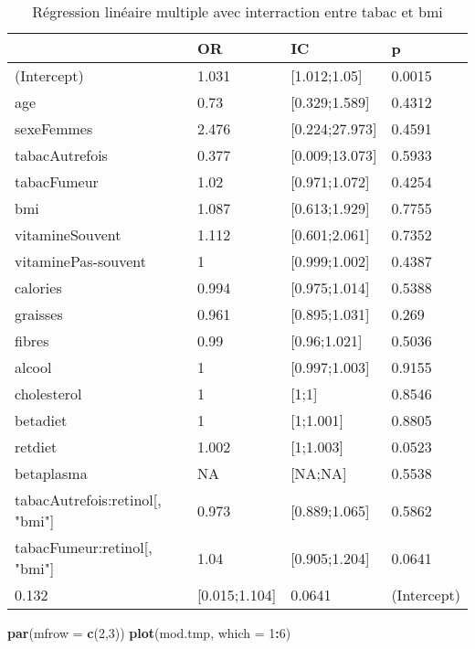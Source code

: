\documentclass[]{article}
\newenvironment{Shaded}{\begin{snugshade}}{\end{snugshade}}
\newcommand{\KeywordTok}[1]{\textcolor[rgb]{0.13,0.29,0.53}{\textbf{#1}}}
\newcommand{\DataTypeTok}[1]{\textcolor[rgb]{0.13,0.29,0.53}{#1}}
\newcommand{\DecValTok}[1]{\textcolor[rgb]{0.00,0.00,0.81}{#1}}
\newcommand{\OperatorTok}[1]{\textcolor[rgb]{0.81,0.36,0.00}{\textbf{#1}}}
\newcommand{\NormalTok}[1]{#1}
\begin{document}
\begin{table}

\caption{\label{tab:unnamed-chunk-85}Régression linéaire multiple avec interraction entre tabac et bmi}
\centering
\begin{tabular}[t]{l|l|l|l}
\hline
  & OR & IC & p\\
\hline
\rowcolor[HTML]{BBD2E1}  (Intercept) & 1.031 & [1.012;1.05] & 0.0015\\
\hline
age & 0.73 & [0.329;1.589] & 0.4312\\
\hline
\rowcolor[HTML]{BBD2E1}  sexeFemmes & 2.476 & [0.224;27.973] & 0.4591\\
\hline
tabacAutrefois & 0.377 & [0.009;13.073] & 0.5933\\
\hline
\rowcolor[HTML]{BBD2E1}  tabacFumeur & 1.02 & [0.971;1.072] & 0.4254\\
\hline
bmi & 1.087 & [0.613;1.929] & 0.7755\\
\hline
\rowcolor[HTML]{BBD2E1}  vitamineSouvent & 1.112 & [0.601;2.061] & 0.7352\\
\hline
vitaminePas-souvent & 1 & [0.999;1.002] & 0.4387\\
\hline
\rowcolor[HTML]{BBD2E1}  calories & 0.994 & [0.975;1.014] & 0.5388\\
\hline
graisses & 0.961 & [0.895;1.031] & 0.269\\
\hline
\rowcolor[HTML]{BBD2E1}  fibres & 0.99 & [0.96;1.021] & 0.5036\\
\hline
alcool & 1 & [0.997;1.003] & 0.9155\\
\hline
\rowcolor[HTML]{BBD2E1}  cholesterol & 1 & [1;1] & 0.8546\\
\hline
betadiet & 1 & [1;1.001] & 0.8805\\
\hline
\rowcolor[HTML]{BBD2E1}  retdiet & 1.002 & [1;1.003] & 0.0523\\
\hline
betaplasma & NA & [NA;NA] & 0.5538\\
\hline
\rowcolor[HTML]{BBD2E1}  tabacAutrefois:retinol[, "bmi"] & 0.973 & [0.889;1.065] & 0.5862\\
\hline
tabacFumeur:retinol[, "bmi"] & 1.04 & [0.905;1.204] & 0.0641\\
\hline
\rowcolor[HTML]{BBD2E1}  0.132 & [0.015;1.104] & 0.0641 & (Intercept)\\
\hline
\end{tabular}
\end{table}

\begin{Shaded}
\begin{Highlighting}[]
\KeywordTok{par}\NormalTok{(}\DataTypeTok{mfrow =} \KeywordTok{c}\NormalTok{(}\DecValTok{2}\NormalTok{,}\DecValTok{3}\NormalTok{))}
\KeywordTok{plot}\NormalTok{(mod.tmp, }\DataTypeTok{which =} \DecValTok{1}\OperatorTok{:}\DecValTok{6}\NormalTok{)}
\end{Highlighting}
\end{Shaded}
\end{document}
